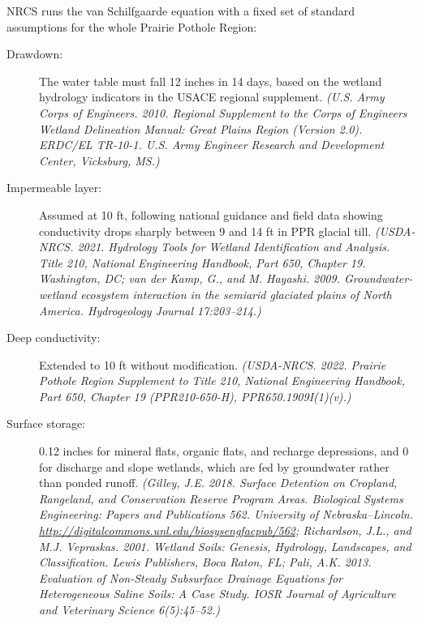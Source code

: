 \documentclass{theme/arpc-memo}
\begin{document}
NRCS runs the van Schilfgaarde equation with a fixed set of standard assumptions for the whole Prairie Pothole Region:

\begin{description}

\item[Drawdown:] The water table must fall 12 inches in 14 days, based on the wetland hydrology indicators in the USACE regional supplement. \textit{(U.S. Army Corps of Engineers. 2010. Regional Supplement to the Corps of Engineers Wetland Delineation Manual: Great Plains Region (Version 2.0). ERDC/EL TR-10-1. U.S. Army Engineer Research and Development Center, Vicksburg, MS.)}

\item[Impermeable layer:] Assumed at 10 ft, following national guidance and field data showing conductivity drops sharply between 9 and 14 ft in PPR glacial till. \textit{(USDA-NRCS. 2021. Hydrology Tools for Wetland Identification and Analysis. Title 210, National Engineering Handbook, Part 650, Chapter 19. Washington, DC; van der Kamp, G., and M. Hayashi. 2009. Groundwater-wetland ecosystem interaction in the semiarid glaciated plains of North America. Hydrogeology Journal 17:203--214.)}

\item[Deep conductivity:] Extended to 10 ft without modification. \textit{(USDA-NRCS. 2022. Prairie Pothole Region Supplement to Title 210, National Engineering Handbook, Part 650, Chapter 19 (PPR210-650-H), PPR650.1909I(1)(v).)}

\item[Surface storage:] 0.12 inches for mineral flats, organic flats, and recharge depressions, and 0 for discharge and slope wetlands, which are fed by groundwater rather than ponded runoff. \textit{(Gilley, J.E. 2018. Surface Detention on Cropland, Rangeland, and Conservation Reserve Program Areas. Biological Systems Engineering: Papers and Publications 562. University of Nebraska--Lincoln. \url{http://digitalcommons.unl.edu/biosysengfacpub/562}; Richardson, J.L., and M.J. Vepraskas. 2001. Wetland Soils: Genesis, Hydrology, Landscapes, and Classification. Lewis Publishers, Boca Raton, FL; Pali, A.K. 2013. Evaluation of Non-Steady Subsurface Drainage Equations for Heterogeneous Saline Soils: A Case Study. IOSR Journal of Agriculture and Veterinary Science 6(5):45--52.)}


\end{description}
\end{document}
